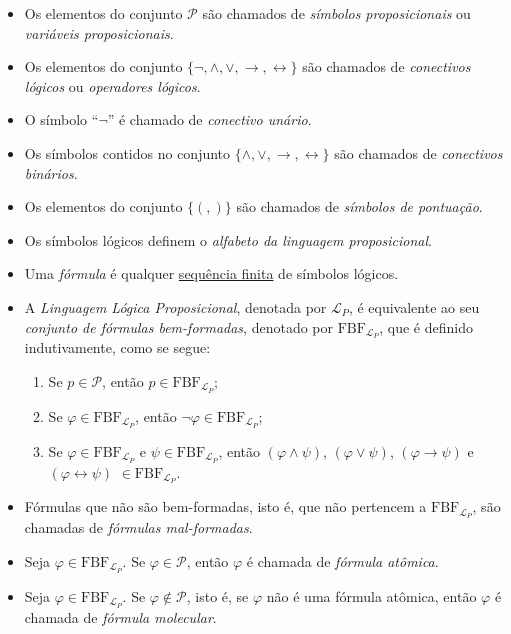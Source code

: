 \begin{itemize}[left=0.5cm, align=left, nosep]
            \item Os elementos do conjunto $\mathcal{P}$ são chamados de \textit{símbolos proposicionais} ou 
            \textit{variáveis proposicionais}.
            \item Os elementos do conjunto $\{\neg, \land, \lor, \rightarrow, \leftrightarrow\}$ são chamados de 
            \textit{conectivos lógicos} ou \textit{operadores lógicos}.
            \item O símbolo ``$\neg$'' é chamado de \textit{conectivo unário}.
            \item Os símbolos contidos no conjunto $\{\land, \lor, \rightarrow, \leftrightarrow\}$ são chamados de 
            \textit{conectivos binários}.
            \item Os elementos do conjunto $\{(, )\}$ são chamados de \textit{símbolos de pontuação}.
            \item Os símbolos lógicos definem o \textit{alfabeto da linguagem proposicional}.
            \item Uma \textit{fórmula} é qualquer \underline{sequência finita} de símbolos lógicos.
            \item A \textit{Linguagem Lógica Proposicional}, denotada por $\mathcal{L}_P$, é equivalente ao seu 
            \textit{conjunto de fórmulas bem-formadas}, denotado por $\text{FBF}_{\mathcal{L}_P}$, que é definido indutivamente, 
            como se segue:
            \begin{enumerate}[left=0.5cm, align=left, nosep]
                \item Se $p \in \mathcal{P}$, então $p \in \text{FBF}_{\mathcal{L}_P}$;
                \item Se $\varphi \in \text{FBF}_{\mathcal{L}_P}$, então $\neg \varphi \in \text{FBF}_{\mathcal{L}_P}$;
                \item Se $\varphi \in \text{FBF}_{\mathcal{L}_P}$ e $\psi \in \text{FBF}_{\mathcal{L}_P}$, então 
                $(\varphi \wedge \psi)$, $(\varphi \vee \psi)$, $(\varphi \rightarrow \psi)$ e $(\varphi \leftrightarrow \psi)$ 
                $\in \text{FBF}_{\mathcal{L}_P}$.
            \end{enumerate}
            \item  Fórmulas que não são bem-formadas, isto é, que não pertencem a $\text{FBF}_{\mathcal{L}_P}$, são chamadas de 
            \textit{fórmulas mal-formadas}.
            \item Seja $\varphi \in \text{FBF}_{\mathcal{L}_P}$. Se $\varphi \in \mathcal{P}$, então $\varphi$ é chamada de 
            \textit{fórmula atômica}.
            \item Seja $\varphi \in \text{FBF}_{\mathcal{L}_P}$. Se $\varphi \notin \mathcal{P}$, isto é, se $\varphi$ não é uma 
            fórmula atômica, então $\varphi$ é chamada de \textit{fórmula molecular}.


\end{itemize}

